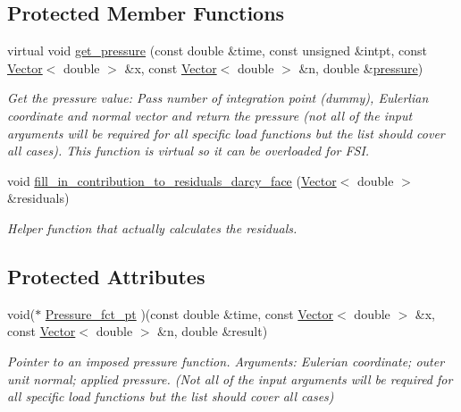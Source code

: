 \subsection*{Protected Member Functions}
\begin{DoxyCompactItemize}
\item 
virtual void \hyperlink{classoomph_1_1DarcyFaceElement_afedbc8695e027c9d1bb80843f2548bc1}{get\+\_\+pressure} (const double \&time, const unsigned \&intpt, const \hyperlink{classoomph_1_1Vector}{Vector}$<$ double $>$ \&x, const \hyperlink{classoomph_1_1Vector}{Vector}$<$ double $>$ \&n, double \&\hyperlink{classoomph_1_1DarcyFaceElement_acb4492022eed505e3b41ee47a6b3bcaa}{pressure})
\begin{DoxyCompactList}\small\item\em Get the pressure value\+: Pass number of integration point (dummy), Eulerlian coordinate and normal vector and return the pressure (not all of the input arguments will be required for all specific load functions but the list should cover all cases). This function is virtual so it can be overloaded for F\+SI. \end{DoxyCompactList}\item 
void \hyperlink{classoomph_1_1DarcyFaceElement_a456b5876a2966eafb5bfe68e7210534d}{fill\+\_\+in\+\_\+contribution\+\_\+to\+\_\+residuals\+\_\+darcy\+\_\+face} (\hyperlink{classoomph_1_1Vector}{Vector}$<$ double $>$ \&residuals)
\begin{DoxyCompactList}\small\item\em Helper function that actually calculates the residuals. \end{DoxyCompactList}\end{DoxyCompactItemize}
\subsection*{Protected Attributes}
\begin{DoxyCompactItemize}
\item 
void($\ast$ \hyperlink{classoomph_1_1DarcyFaceElement_a39c6156b3067d3ff047eb7cf62d36b4c}{Pressure\+\_\+fct\+\_\+pt} )(const double \&time, const \hyperlink{classoomph_1_1Vector}{Vector}$<$ double $>$ \&x, const \hyperlink{classoomph_1_1Vector}{Vector}$<$ double $>$ \&n, double \&result)
\begin{DoxyCompactList}\small\item\em Pointer to an imposed pressure function. Arguments\+: Eulerian coordinate; outer unit normal; applied pressure. (Not all of the input arguments will be required for all specific load functions but the list should cover all cases) \end{DoxyCompactList}\end{DoxyCompactItemize}
